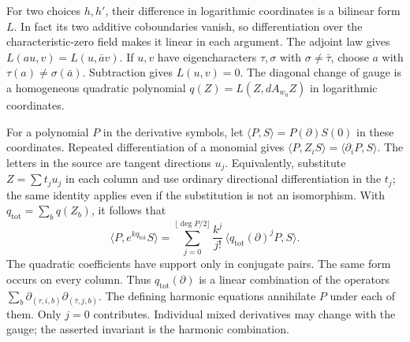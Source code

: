 For two choices \(h,h'\), their difference in logarithmic coordinates
is a bilinear form \(L\). In fact its two additive coboundaries
vanish, so differentiation over the characteristic-zero field makes
it linear in each argument. The adjoint law gives
\(L(au,v)=L(u,\bar a v)\). If \(u,v\) have eigencharacters
\(\tau,\sigma\) with \(\sigma\ne\bar\tau\), choose \(a\) with
\(\tau(a)\ne\sigma(\bar a)\). Subtraction gives \(L(u,v)=0\).
The diagonal change of gauge is a homogeneous quadratic polynomial
\(q(Z)=L(Z,dA_{w_0}Z)\) in logarithmic coordinates.

For a polynomial \(P\) in the derivative symbols, let
\(\langle P,S\rangle=P(\partial)S(0)\) in these coordinates.
Repeated differentiation of a monomial gives
\(\langle P,Z_iS\rangle=\langle\partial_iP,S\rangle\).
The letters in the source are tangent directions \(u_j\). Equivalently,
substitute \(Z=\sum t_j u_j\) in each column and use ordinary
directional differentiation in the \(t_j\); the same identity
applies even if the substitution is not an isomorphism. With
\(q_{\mathrm{tot}}=\sum_b q(Z_b)\), it follows that
\[
  \langle P,e^{kq_{\mathrm{tot}}}S\rangle
   =\sum_{j=0}^{\lfloor\deg P/2\rfloor}
       \frac{k^j}{j!}\,
          \langle q_{\mathrm{tot}}(\partial)^j P,S\rangle .
\]
The quadratic coefficients have support only in conjugate pairs.
The same form occurs on every column. Thus
\(q_{\mathrm{tot}}(\partial)\) is a linear combination of the
operators
\(\sum_b\partial_{(\tau,i,b)}\partial_{(\bar\tau,j,b)}\).
The defining harmonic equations annihilate \(P\) under each of them.
Only \(j=0\) contributes. Individual mixed derivatives may change
with the gauge; the asserted invariant is the harmonic combination.

